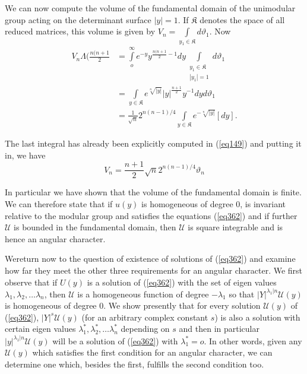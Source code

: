  We can now compute the volume of the fundamental domain of the
 unimodular group acting on the determinant surface $| y | = 1$. If
 $\mathfrak{K}$ denotes the space of all reduced matrices, this volume
 is given by $V_n = \int\limits_{y_1 \in \mathfrak{K}} d
 \vartheta_1$. Now 
 \begin{align*}
V_n \Lambda (\frac{n (n + 1}{2} & = \int\limits^{\infty}_{o} e^{- y}
y^{\frac{n (n + 1}{2} - 1} dy \int\limits_{\substack{y _1 \in
    \mathfrak{K}\\ | y _1 | = 1}} d \vartheta_1 \\ 
& = \int\limits_{y \in \mathfrak{K}} e^{\sqrt[n]{| y |}} | y
|^{\frac{n+1}{2}} y^{-1} dy d \vartheta_1\\ 
& = \frac{1}{\sqrt{n}} 2^{n(n-1)/4} \int\limits_{y \in \mathfrak{K}}
e^{- \sqrt[n]{| y |}} [d y]. 
 \end{align*} 
 
 The last integral has already been explicitly computed in (\ref{eq149}) and
 putting it in, we have 
 \begin{equation*}
V_n = \frac{n + 1}{2} \sqrt{n} 2^{n (n-1)/4} \vartheta_n \tag{384}\label{eq384}
 \end{equation*} 
 
 In particular we have shown that the volume of the fundamental domain
 is finite. We can therefore state that if $u (y)$ is homogeneous of
 degree 0, is invariant relative to the modular group and satisfies
 the equations (\ref{eq362}) and if further $\mathcal{U}$ is bounded in the
 fundamental domain, then $\mathcal{U}$ is square integrable and is
 hence an angular character. 
 
 We\pageoriginale return now to the question of existence of solutions
 of (\ref{eq362})  and examine how far they meet the other three
 requirements for an  angular character. We first observe that if $U
 (y)$ is a solution of  (\ref{eq362}) with the set of eigen values
 $\lambda_1, \lambda_2, \ldots  \lambda_n$, then $\mathcal{U}$ is a
 homogeneous function of degree  $-\lambda_1$ so that $| Y
 |^{\lambda_1|n} \mathcal{U}(y)$  is  homogeneous of degree 0. We show
 presently that for every solution  $\mathcal{U} (y) $ of
 (\ref{eq362}), $| Y |^s \mathcal{U} (y)$ (for an  arbitrary complex
 constant $s$) is also a solution with certain eigen 
 values $\lambda^*_1, \lambda_2^*, \ldots \lambda^*_n$ depending on
 $s$ and then in particular $| y |^{\lambda_1| n} \mathcal{U} (y)$
 will be a solution of (\ref{eq362}) with $\lambda^*_1 = o$. In other words,
 given any $\mathcal{U} (y)$ which satisfies the first condition for
 an angular character, we can determine one which, besides the first,
 fulfills the second condition too. 
 
